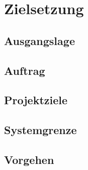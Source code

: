 \chapter{Zielsetzung}

\section{Ausgangslage}
\section{Auftrag}
\section{Projektziele}


\section{Systemgrenze}
\section{Vorgehen}
